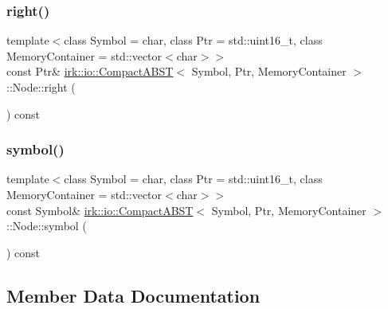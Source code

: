 \mbox{\label{structirk_1_1io_1_1CompactABST_1_1Node_a7444ab4727023ff97740e139265bb4be}} 
\subsubsection{\texorpdfstring{right()}{right()}}
{\footnotesize\ttfamily template$<$class Symbol = char, class Ptr = std\+::uint16\+\_\+t, class Memory\+Container = std\+::vector$<$char$>$$>$ \\
const Ptr\& \mbox{\hyperlink{classirk_1_1io_1_1CompactABST}{irk\+::io\+::\+Compact\+A\+B\+ST}}$<$ Symbol, Ptr, Memory\+Container $>$\+::Node\+::right (\begin{DoxyParamCaption}{ }\end{DoxyParamCaption}) const\hspace{0.3cm}{\ttfamily [inline]}}

\mbox{\label{structirk_1_1io_1_1CompactABST_1_1Node_ad0c9be37068d8febb3d50201a39f2a62}} 
\subsubsection{\texorpdfstring{symbol()}{symbol()}}
{\footnotesize\ttfamily template$<$class Symbol = char, class Ptr = std\+::uint16\+\_\+t, class Memory\+Container = std\+::vector$<$char$>$$>$ \\
const Symbol\& \mbox{\hyperlink{classirk_1_1io_1_1CompactABST}{irk\+::io\+::\+Compact\+A\+B\+ST}}$<$ Symbol, Ptr, Memory\+Container $>$\+::Node\+::symbol (\begin{DoxyParamCaption}{ }\end{DoxyParamCaption}) const\hspace{0.3cm}{\ttfamily [inline]}}



\subsection{Member Data Documentation}
\mbox{\label{structirk_1_1io_1_1CompactABST_1_1Node_a5a1367440b6f9f5ea3ebe13e19dd359a}} 
